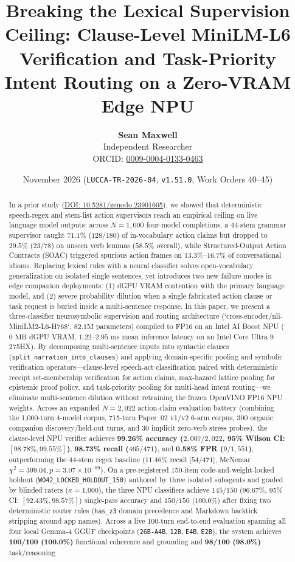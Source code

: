 \documentclass[11pt,a4paper]{article}
\title{\textbf{Breaking the Lexical Supervision Ceiling: Clause-Level MiniLM-L6 Verification and Task-Priority Intent Routing on a Zero-VRAM Edge NPU}}
\author{
  \textbf{Sean Maxwell} \\
  Independent Researcher \\
  ORCID: \href{https://orcid.org/0009-0004-0133-0463}{0009-0004-0133-0463}
}
\date{November 2026 (\texttt{LUCCA-TR-2026-04}, \texttt{v1.51.0}, Work Orders 40--45)}
\begin{document}
\maketitle

\begin{abstract}
In a prior study (\href{https://doi.org/10.5281/zenodo.23901605}{DOI: 10.5281/zenodo.23901605}), we showed that deterministic speech-regex and stem-list action supervisors reach an empirical ceiling on live language model outputs: across $N=1{,}000$ four-model completions, a 44-stem grammar supervisor caught $71.1\%$ ($128/180$) of in-vocabulary action claims but dropped to $29.5\%$ ($23/78$) on unseen verb lemmas ($58.5\%$ overall), while Structured-Output Action Contracts (SOAC) triggered spurious action frames on $13.3\%$--$16.7\%$ of conversational idioms. Replacing lexical rules with a neural classifier solves open-vocabulary generalization on isolated single sentences, yet introduces two new failure modes in edge companion deployments: (1) dGPU VRAM contention with the primary language model, and (2) severe probability dilution when a single fabricated action clause or task request is buried inside a multi-sentence response. In this paper, we present a three-classifier neurosymbolic supervision and routing architecture (`cross-encoder/nli-MiniLM2-L6-H768`, $82.1\text{M}$ parameters) compiled to FP16 on an Intel AI Boost NPU ($0\text{ MB}$ dGPU VRAM, $1.22$--$2.95\text{ ms}$ mean inference latency on an Intel Core Ultra 9 275HX). By decomposing multi-sentence inputs into syntactic clauses (\texttt{split\_narration\_into\_clauses}) and applying domain-specific pooling and symbolic verification operators---clause-level speech-act classification paired with deterministic receipt set-membership verification for action claims, max-hazard lattice pooling for epistemic proof policy, and task-priority pooling for multi-head intent routing---we eliminate multi-sentence dilution without retraining the frozen OpenVINO FP16 NPU weights. Across an expanded $N=2{,}022$ action-claim evaluation battery (combining the 1,000-turn 4-model corpus, 715-turn Paper~02 v1/v2 6-arm corpus, 300 organic companion discovery/held-out turns, and 30 implicit zero-verb stress probes), the clause-level NPU verifier achieves \textbf{99.26\% accuracy ($2{,}007/2{,}022$, 95\% Wilson CI: $[98.78\%, 99.55\%]$)}, \textbf{98.73\% recall ($465/471$)}, and \textbf{0.58\% FPR ($9/1{,}551$)}, outperforming the 44-stem regex baseline ($11.46\%$ recall [$54/471$], McNemar $\chi^2 = 399.04, p = 3.07 \times 10^{-89}$). On a pre-registered 150-item code-and-weight-locked holdout (\texttt{WO42\_LOCKED\_HOLDOUT\_150}) authored by three isolated subagents and graded by blinded raters ($\kappa = 1.000$), the three NPU classifiers achieve $145/150$ ($96.67\%$, 95\% CI: $[92.43\%, 98.57\%]$) single-pass accuracy and $150/150$ ($100.0\%$) after fixing two deterministic router rules (\texttt{has\_z3} domain precedence and Markdown backtick stripping around app names). Across a live 100-turn end-to-end evaluation spanning all four local Gemma-4 GGUF checkpoints (\texttt{26B-A4B}, \texttt{12B}, \texttt{E4B}, \texttt{E2B}), the system achieves \textbf{100/100 (100.0\%)} functional coherence and grounding and \textbf{98/100 (98.0\%)} task/reasoning 
\end{abstract}
\end{document}
